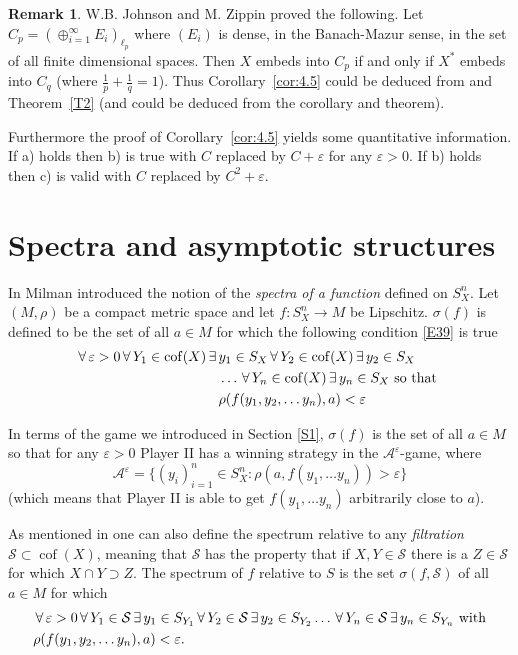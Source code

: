\documentclass[11pt,leqno]{amsart}
\theoremstyle{definition}
\newtheorem*{remark}{Remark}
\newcommand{\vp}{\varepsilon}
\newcommand{\cof}{\operatorname{cof}}
\newcommand{\cA}{\mathcal{A}}
\newcommand{\cS}{\mathcal{S}}
\begin{document}
\begin{remark}
W.B. Johnson and M. Zippin \cite{JZ} proved the following. 
Let $C_p = (\oplus_{i=1}^\infty E_i)_{\ell_p}$ where $(E_i)$ is dense, in the 
Banach-Mazur sense, in the set of all finite dimensional spaces. 
Then $X$ embeds into $C_p$ if and only if $X^*$ embeds into $C_q$ 
(where $\frac1p +\frac1q =1$). 
Thus Corollary~\ref{cor:4.5} could be deduced from \cite{JZ} and 
Theorem~\ref{T2} (and \cite{JZ} could be deduced from the corollary and 
theorem). 

Furthermore the proof of Corollary~\ref{cor:4.5} yields some quantitative 
information. 
If a) holds then b) is true with $C$ replaced by $C+\vp$ for any $\vp>0$. 
If b) holds then c) is valid with $C$ replaced by $C^2+\vp$.  
\end{remark}
    
\section{Spectra and asymptotic structures }\label{S4}
 
In \cite{Mi}  Milman introduced the notion of the 
{\em spectra of a function\/} defined on $S^n_X$. 
Let $(M,\rho)$ be a compact metric space and let $f:S^n_X\to M$ be Lipschitz.
$\sigma(f)$ is defined to be the set of all $a\in M$ for which the 
following condition \eqref{E39} is true
\begin{align}\label{E39}
\forall\, \vp>0\, \forall\,  Y_1\in\cof(X)\, \exists\, 
& y_1\in S_X\,\forall\, Y_2\in\cof(X)\,\exists\, y_2\in S_X\\
&\ldots\,\forall\, Y_n\in\cof(X)\,\exists\, y_n\in S_X \text{ so that }\notag\\
&\rho(f(y_1,y_2,\ldots y_n),a)<\vp \notag
\end{align}
  
In terms of the game we introduced in  Section \ref{S1},  
$\sigma(f)$ is the set of  all  $a\in M$ so that
for any $\vp>0$ Player II has a winning strategy in the $\cA^\vp$-game, where
$$\cA^\vp=\{(y_i)_{i=1}^n\in S^n_X : \rho(a,f(y_1,\ldots y_n))>\vp\}$$
(which means that Player II is able to get 
$f(y_1,\ldots y_n)$ arbitrarily close to $a$).
  
As mentioned in \cite{Mi} one can also  define the spectrum relative 
to any {\em filtration\/} $\cS\subset\cof(X)$, 
meaning that $\cS$ has 
the property that if $X,Y\in\cS$ there is a $Z\in\cS$ for 
which $X\cap Y\supset Z$.
The spectrum of $f$ relative to $S$ is the set $\sigma(f,\cS)$ 
of all $a\in M$ for which
\begin{align}\label{E40}
&\,\forall\,\vp>0\,\forall\, Y_1\in\cS\,\exists\, y_1\in S_{Y_1}
\,\forall\, Y_2\in\cS\,\exists\, y_2\in S_{Y_2}\ldots\,\forall\, 
Y_n\in\cS\,\exists\, y_n\in S_{Y_n}\text{ with}\\
&\rho(f(y_1,y_2,\ldots y_n),a)<\vp. \notag
 \end{align}
\end{document}
